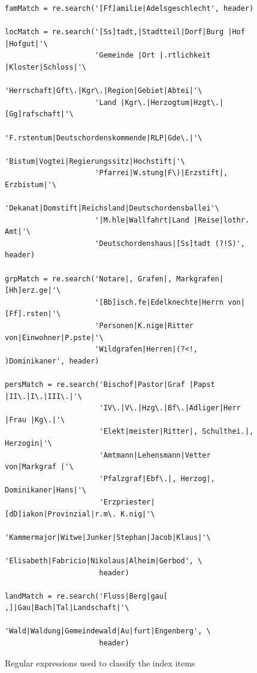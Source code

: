 \begin{figure}
\centering
\begin{verbatim}
famMatch = re.search('[Ff]amilie|Adelsgeschlecht', header)

locMatch = re.search('[Ss]tadt,|Stadtteil|Dorf|Burg |Hof |Hofgut|'\
                     'Gemeinde |Ort |.rtlichkeit |Kloster|Schloss|'\
                     'Herrschaft|Gft\.|Kgr\.|Region|Gebiet|Abtei|'\
                     'Land |Kgr\.|Herzogtum|Hzgt\.|[Gg]rafschaft|'\
                     'F.rstentum|Deutschordenskommende|RLP|Gde\.|'\
                     'Bistum|Vogtei|Regierungssitz|Hochstift|'\
                     'Pfarrei|W.stung|F\)|Erzstift|, Erzbistum|'\
                     'Dekanat|Domstift|Reichsland|Deutschordensballei'\
                     '|M.hle|Wallfahrt|Land |Reise|lothr. Amt|'\
                     'Deutschordenshaus|[Ss]tadt (?!S)', header)

grpMatch = re.search('Notare|, Grafen|, Markgrafen|[Hh]erz.ge|'\
                     '[Bb]isch.fe|Edelknechte|Herrn von|[Ff].rsten|'\
                     'Personen|K.nige|Ritter von|Einwohner|P.pste|'\
                     'Wildgrafen|Herren|(?<!, )Dominikaner', header)

persMatch = re.search('Bischof|Pastor|Graf |Papst |II\.|I\.|III\.|'\
                      'IV\.|V\.|Hzg\.|Bf\.|Adliger|Herr |Frau |Kg\.|'\
                      'Elekt|meister|Ritter|, Schulthei.|, Herzogin|'\
                      'Amtmann|Lehensmann|Vetter von|Markgraf |'\
                      'Pfalzgraf|Ebf\.|, Herzog|, Dominikaner|Hans|'\
                      'Erzpriester|[dD]iakon|Provinzial|r.m\. K.nig|'\
                      'Kammermajor|Witwe|Junker|Stephan|Jacob|Klaus|'\
                      'Elisabeth|Fabricio|Nikolaus|Alheim|Gerbod', \
                      header)

landMatch = re.search('Fluss|Berg|gau[ ,]|Gau|Bach|Tal|Landschaft|'\
                      'Wald|Waldung|Gemeindewald|Au|furt|Engenberg', \
                      header)

\end{verbatim}
\caption{Regular expressions used to classify the index items}
\label{fig:regex}
\end{figure}


